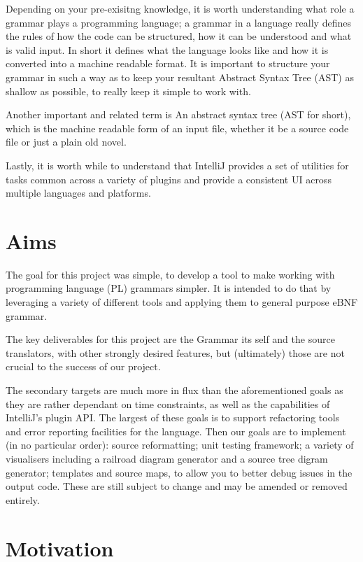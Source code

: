 \documentclass[11pt]{article}
\begin{document}
Depending on your pre-exisitng knowledge, it is worth understanding what role a grammar plays a programming language; a grammar in a language really defines the rules of how the code can be structured, how it can be understood and what is valid input. In short it defines what the language looks like and how it is converted into a machine readable format. It is important to structure your grammar in such a way as to keep your resultant Abstract Syntax Tree (AST) as shallow as possible, to really keep it simple to work with.

Another important and related term is An abstract syntax tree (AST for short), which is the machine readable form of an input file, whether it be a source code file or just a plain old novel. 

Lastly, it is worth while to understand that IntelliJ provides a set of utilities for tasks common across a variety of plugins and provide a consistent UI across multiple languages and platforms.

\section{Aims}

The goal for this project was simple, to develop a tool to make working with programming language (PL) grammars simpler. It is intended to do that by leveraging a variety of different tools and applying them to general purpose eBNF grammar. 

The key deliverables for this project are the Grammar its self and the source translators, with other strongly desired features, but (ultimately) those are not crucial to the success of our project. 

The secondary targets are much more in flux than the aforementioned goals as they are rather dependant on time constraints, as well as the capabilities of IntelliJ's plugin API. The largest of these goals is to support refactoring tools and error reporting facilities for the language. Then our goals are to implement (in no particular order): source reformatting; unit testing framework; a variety of visualisers including a railroad diagram generator and a source tree digram generator; templates and source maps, to allow you to better debug issues in the output code. These are still subject to change and may be amended or removed entirely.

\section{Motivation}
\end{document}
